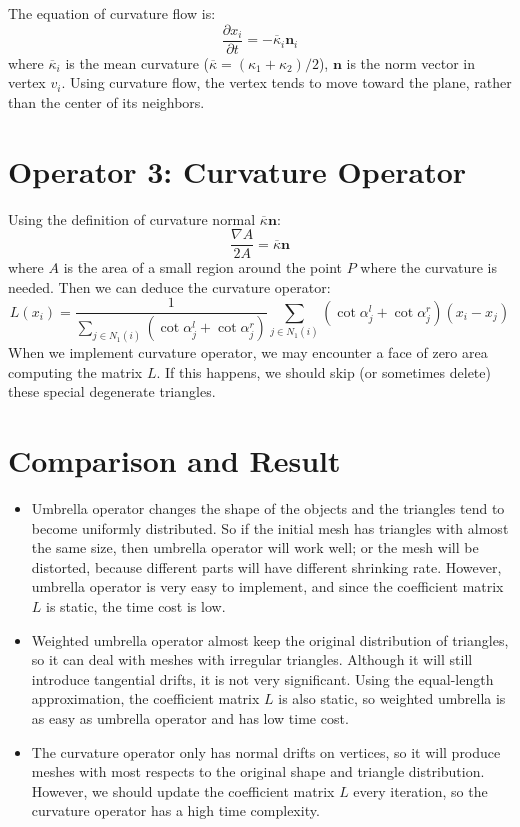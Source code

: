 \documentclass[tog]{acmsiggraph}
\begin{document}
The equation of curvature flow is:
\begin{equation}
	\frac{\partial x_i}{\partial t} = -\overline{\kappa}_i \textbf{n}_i
\end{equation}
where $\overline{\kappa}_i$ is the mean curvature ($\overline{\kappa} = (\kappa_1 + \kappa_2) / 2$), $\textbf{n}$ is the norm vector in vertex $v_i$. Using curvature flow, the vertex tends to move toward the plane, rather than the center of its neighbors.

\section{Operator 3: Curvature Operator}

Using the definition of curvature normal $\overline{\kappa} \textbf{n}$:
\begin{equation}
	\frac{\nabla A}{2A} = \overline{\kappa} \textbf{n}
\end{equation}
where $A$ is the area of a small region around the point $P$ where the curvature is needed. Then we can deduce the curvature operator:
\begin{equation}
	L(x_i) = \frac{1}{\sum_{j \in N_1(i)} (\cot \alpha_j^l + \cot \alpha_j^r)} \sum_{j \in N_1(i)} (\cot \alpha_j^l + \cot \alpha_j^r)(x_i - x_j)
\end{equation}
When we implement curvature operator, we may encounter a face of zero area computing the matrix $L$. If this happens, we should skip (or sometimes delete) these special degenerate triangles.


\section{Comparison and Result}

\begin{itemize}
	\item Umbrella operator changes the shape of the objects and the triangles tend to become uniformly distributed. So if the initial mesh has triangles with almost the same size, then umbrella operator will work well; or the mesh will be distorted, because different parts will have different shrinking rate. However, umbrella operator is very easy to implement, and since the coefficient matrix $L$ is static, the time cost is low.
	\item Weighted umbrella operator almost keep the original distribution of triangles, so it can deal with meshes with irregular triangles. Although it will still introduce tangential drifts, it is not very significant. Using the equal-length approximation, the coefficient matrix $L$ is also static, so weighted umbrella is as easy as umbrella operator and has low time cost.
	\item The curvature operator only has normal drifts on vertices, so it will produce meshes with most respects to the original shape and triangle distribution. However, we should update the coefficient matrix $L$ every iteration, so the curvature operator has a high time complexity.
\end{itemize}
\end{document}
